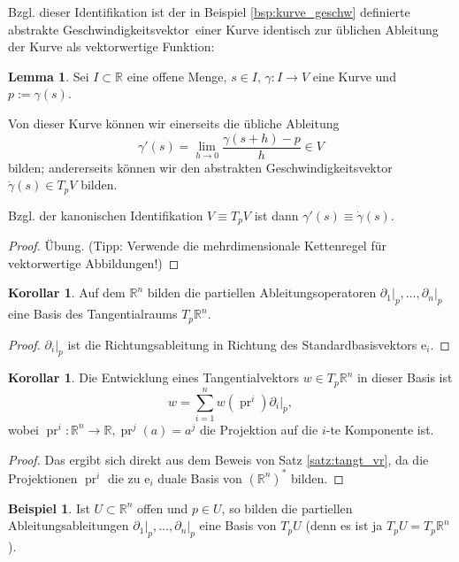 \documentclass[a4paper]{scrbook}
\numberwithin{equation}{chapter}
\newcommand{\e}{\mathrm{e}}
\DeclareMathOperator{\pr}{pr}
\newcommand{\R}{\mathbb{R}}
\theoremstyle{definition}
\newtheorem{lemma}[defn]{Lemma}
\newtheorem{kor}[defn]{Korollar}
\newtheorem{bsp}[defn]{Beispiel}
\begin{document}
Bzgl. dieser Identifikation ist der in Beispiel \ref{bsp:kurve_geschw} definierte abstrakte \glqq Geschwindigkeitsvektor\grqq\ einer Kurve identisch zur üblichen Ableitung der Kurve als vektorwertige Funktion:
\begin{lemma}
	Sei $I\subset \R$ eine offene Menge, $s\in I$, $\gamma\colon I\to V$ eine Kurve und $p := \gamma(s)$.

	Von dieser Kurve können wir einerseits die übliche Ableitung
	\[\gamma'(s) = \lim_{h\to 0} \frac{\gamma(s+h) - p}{h} \in V\]
	bilden; andererseits können wir den abstrakten Geschwindigkeitsvektor $\dot\gamma(s) \in T_pV$ bilden.

	Bzgl. der kanonischen Identifikation $V \equiv T_pV$ ist dann $\gamma'(s) \equiv \dot\gamma(s)$.

	\begin{proof}
		Übung. (Tipp: Verwende die mehrdimensionale Kettenregel für vektorwertige Abbildungen!)
	\end{proof}
\end{lemma}

\begin{kor}
	Auf dem $\mathbb R^n$ bilden die partiellen Ableitungsoperatoren $\left.\partial_1\right|_p, \dots, \left.\partial_n\right|_p$ eine Basis des Tangentialraums $T_p\mathbb R^n$.

	\begin{proof}
		$\left.\partial_i\right|_p$ ist die Richtungsableitung in Richtung des Standardbasisvektors $\e_i$.
	\end{proof}
\end{kor}

\begin{kor} \label{kor:entw_tangt_Rn}
	Die Entwicklung eines Tangentialvektors $w \in T_p\mathbb R^n$ in dieser Basis ist
	\[w = \sum_{i=1}^n w(\pr^i) \left.\partial_i\right|_p,\]
	wobei $\pr^i\colon \mathbb R^n \to \mathbb R, \pr^j(a) = a^j$ die Projektion auf die $i$-te Komponente ist.

	\begin{proof}
		Das ergibt sich direkt aus dem Beweis von Satz \ref{satz:tangt_vr}, da die Projektionen $\pr^i$ die zu $\e_i$ duale Basis von $(\mathbb R^n)^*$ bilden.
	\end{proof}
\end{kor}

\begin{bsp}
	Ist $U\subset\mathbb R^n$ offen und $p\in U$, so bilden die partiellen Ableitungsableitungen $\left.\partial_1\right|_p, \dots, \left.\partial_n\right|_p$ eine Basis von $T_pU$ (denn es ist ja $T_pU = T_p\mathbb R^n$).
\end{bsp}
\end{document}
